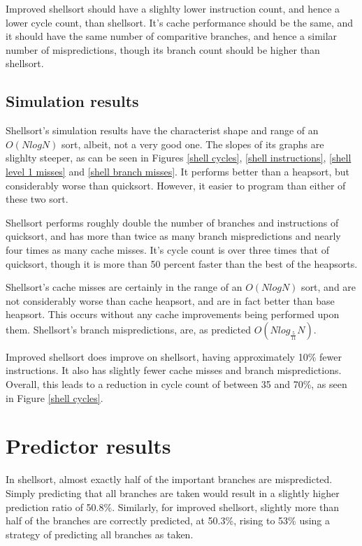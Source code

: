 Improved shellsort should have a slighlty lower instruction count, and hence a
lower cycle count, than shellsort. It's cache performance should be the same,
and it should have the same number of comparitive branches, and hence a similar
number of mispredictions, though its branch count should be higher than
shellsort.


\subsection{Simulation results}

Shellsort's simulation results have the characterist shape and range of an
$O(NlogN)$ sort, albeit, not a very good one. The slopes of its graphs are
slighlty steeper, as can be seen in Figures \ref{shell cycles}, \ref{shell
instructions}, \ref{shell level 1 misses} and \ref{shell branch
misses}. It performs better than a
heapsort, but considerably worse than quicksort. However, it easier to program
than either of these two sort.

Shellsort performs roughly double the number of branches and instructions of
quicksort, and has more than twice as many branch mispredictions and nearly
four times as many cache misses. It's cycle count is over three times that of
quicksort, though it is more than 50 percent faster than the best of the
heapsorts.

Shellsort's cache misses are certainly in the range of an $O(NlogN)$ sort, and
are not considerably worse than cache heapsort, and are in fact better than base
heapsort. This occurs without any cache improvements being performed upon them.
Shellsort's branch mispredictions, are, as predicted $O(Nlog_{\frac{5}{11}}N)$. 

Improved shellsort does improve on shellsort, having approximately 10\% fewer
instructions. It also has slightly fewer cache misses and branch mispredictions.
Overall, this leads to a reduction in cycle count of between 35 and 70\%, as
seen in Figure \ref{shell cycles}.

\section{Predictor results}


In shellsort, almost exactly half of the important branches are mispredicted.
Simply predicting that all branches are taken would result in a slightly higher
prediction ratio of 50.8\%. Similarly, for improved shellsort, slightly more
than half of the branches are correctly predicted, at 50.3\%, rising to 53\%
using a strategy of predicting all branches as taken.

